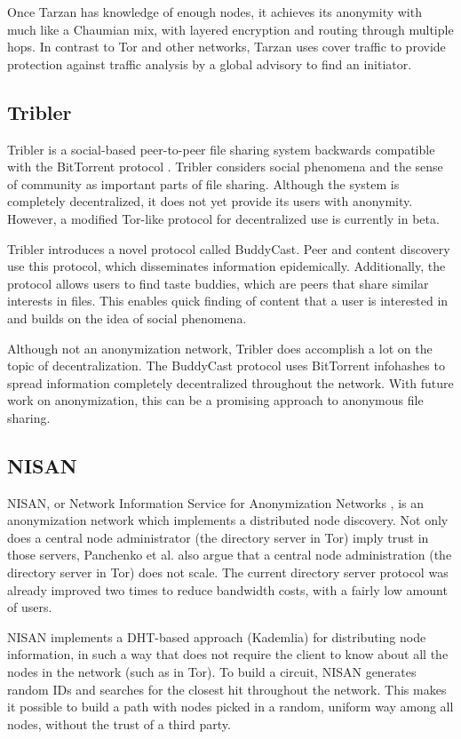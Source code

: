 \documentclass{article}
\begin{document}
		Once Tarzan has knowledge of enough nodes, it achieves its anonymity with much like a Chaumian mix, with layered encryption and routing through multiple hops. In contrast to Tor and other networks, Tarzan uses cover traffic to provide protection against traffic analysis by a global advisory to find an initiator.
		
	\subsection{Tribler} %
		Tribler is a social-based peer-to-peer file sharing system backwards compatible with the BitTorrent protocol \cite{pouwelse2008tribler}. Tribler considers social phenomena and the sense of community as important parts of file sharing. Although the system is completely decentralized, it does not yet provide its users with anonymity. However, a modified Tor-like protocol for decentralized use is currently in beta.
		
		Tribler introduces a novel protocol called BuddyCast. Peer and content discovery use this protocol, which disseminates information epidemically. Additionally, the protocol allows users to find taste buddies, which are peers that share similar interests in files. This enables quick finding of content that a user is interested in and builds on the idea of social phenomena.
		
		Although not an anonymization network, Tribler does accomplish a lot on the topic of decentralization. The BuddyCast protocol uses BitTorrent infohashes to spread information completely decentralized throughout the network. With future work on anonymization, this can be a promising approach to anonymous file sharing.

	\subsection{NISAN} %
		NISAN, or Network Information Service for Anonymization Networks \cite{panchenko2006nisan}, is an anonymization network which implements a distributed node discovery. Not only does a central node administrator (the directory server in Tor) imply trust in those servers, Panchenko et al. also argue that a central node administration (the directory server in Tor) does not scale. The current directory server protocol was already improved two times to reduce bandwidth costs, with a fairly low amount of users.
		
		NISAN implements a DHT-based approach (Kademlia) for distributing node information, in such a way that does not require the client to know about all the nodes in the network (such as in Tor). To build a circuit, NISAN generates random IDs and searches for the closest hit throughout the network. This makes it possible to build a path with nodes picked in a random, uniform way among all nodes, without the trust of a third party.
		
\end{document}
